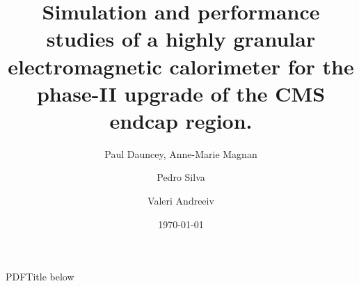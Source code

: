 \newlength\cmsFigWidth
{}

PDFTitle below \title{Simulation and performance studies of a highly
granular electromagnetic calorimeter for the phase-II upgrade of the
CMS endcap region.}

\address[IC]{Imperial College London (UK)}
\author[IC]{Paul Dauncey, Anne-Marie Magnan}    
\address[CERN]{CERN}
\author[CERN]{Pedro Silva}
\address[UCLA]{UCLA}
\author[UCLA]{Valeri Andreeiv}


\date{\today}


